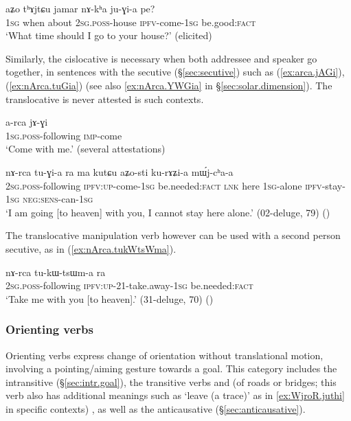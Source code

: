 \begin{exe}
\ex \label{ex:nAkha.juGia}
\gll  aʑo tʰɤjtɕu jamar nɤ-kʰa ju-ɣi-a pe? \\
\textsc{1sg} when about \textsc{2sg}.\textsc{poss}-house \textsc{ipfv}-come-\textsc{1sg} be.good:\textsc{fact} \\
\glt  `What time should I go to your house?' (elicited)
\end{exe}

Similarly, the cislocative is necessary when both addressee and speaker go together, in sentences with the secutive  (§\ref{sec:secutive}) such as (\ref{ex:arca.jAGi}), (\ref{ex:nArca.tuGia}) (see also \ref{ex:nArca.YWGia} in §\ref{sec:solar.dimension}). The translocative  is never attested is such contexts.

\begin{exe}
\ex \label{ex:arca.jAGi}
\gll  a-rca jɤ-ɣi  \\
\textsc{1sg}.\textsc{poss}-following \textsc{imp}-come  \\
\glt `Come with me.' (several attestations)
\end{exe}
 
\begin{exe}
\ex \label{ex:nArca.tuGia}
\gll  nɤ-rca tu-ɣi-a ra ma kutɕu aʑo-sti ku-rɤʑi-a mɯ́j-cʰa-a \\
\textsc{2sg}.\textsc{poss}-following \textsc{ipfv}:\textsc{up}-come-\textsc{1sg} be.needed:\textsc{fact}  \textsc{lnk} here \textsc{1sg}-alone \textsc{ipfv}-stay-\textsc{1sg} \textsc{neg}:\textsc{sens}-can-\textsc{1sg} \\
\glt `I am going [to heaven] with you, I cannot stay here alone.' (02-deluge, 79) ()
\end{exe}
 
 The translocative manipulation verb  however can be used with a second person secutive, as in (\ref{ex:nArca.tukWtsWma}).
 
 \begin{exe}
\ex \label{ex:nArca.tukWtsWma}
\gll    nɤ-rca tu-kɯ-tsɯm-a ra \\
\textsc{2sg}.\textsc{poss}-following \textsc{ipfv}:\textsc{up}-2\fl{}1-take.away-\textsc{1sg} be.needed:\textsc{fact}\\
\glt `Take me with you [to heaven].' (31-deluge, 70) ()
 \end{exe}
 
\subsubsection{Orienting verbs} \label{sec:orienting.verbs} 
Orienting verbs express change of orientation without translational motion, involving a pointing/aiming gesture towards a goal. This category includes the intransitive  (§\ref{sec:intr.goal}), the transitive verbs  and  (of roads or bridges; this verb also has additional meanings such as `leave (a trace)' as in \ref{ex:WjroR.juthi} in specific contexts) , as well as the anticausative  (§\ref{sec:anticausative}). 

